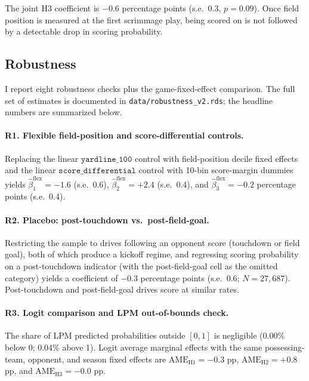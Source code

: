 \documentclass[11pt]{article}
\begin{document}
The joint H3 coefficient is $-0.6$ percentage points (s.e.\ 0.3,
$p=0.09$). Once field position is measured at the first scrimmage play,
being scored on is not followed by a detectable drop in scoring
probability.

\subsection{Robustness}\label{sec:robust}

I report eight robustness checks plus the game-fixed-effect comparison. The
full set of estimates is documented in \texttt{data/robustness\_v2.rds}; the
headline numbers are summarized below.

\paragraph{R1. Flexible field-position and score-differential controls.}
Replacing the linear $\texttt{yardline\_100}$ control with field-position
decile fixed effects and the linear $\texttt{score\_differential}$ control
with 10-bin score-margin dummies yields $\hat\beta_1^{\text{flex}} = -1.6$
(s.e.\ 0.6), $\hat\beta_2^{\text{flex}} = +2.4$ (s.e.\ 0.4), and
$\hat\beta_3^{\text{flex}} = -0.2$ percentage points (s.e.\ 0.4).

\paragraph{R2. Placebo: post-touchdown vs.\ post-field-goal.} Restricting
the sample to drives following an opponent score (touchdown or field goal),
both of which produce a kickoff regime, and regressing scoring probability
on a post-touchdown indicator (with the post-field-goal cell as the omitted
category) yields a coefficient of $-0.3$ percentage points (s.e.\ 0.6;
$N = 27{,}687$). Post-touchdown and post-field-goal drives score at
similar rates.

\paragraph{R3. Logit comparison and LPM out-of-bounds check.} The share of
LPM predicted probabilities outside $[0,1]$ is negligible (0.00\% below 0;
0.04\% above 1). Logit average marginal effects with the same
possessing-team, opponent, and season fixed effects are
$\text{AME}_{\text{H1}} = -0.3$ pp, $\text{AME}_{\text{H2}} = +0.8$ pp,
and $\text{AME}_{\text{H3}} = -0.0$ pp.
\end{document}
